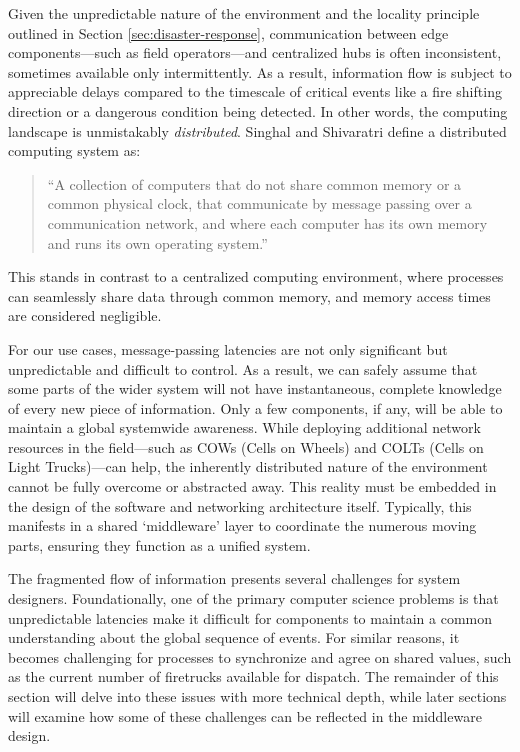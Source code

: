 \documentclass[]             %
{NASA}                       %
\theoremstyle{definition}
\begin{document}
Given the unpredictable nature of the environment and the locality
principle outlined in Section \ref{sec:disaster-response},
communication between edge components---such as field operators---and
centralized hubs is often inconsistent, sometimes available only
intermittently. As a result, information flow is subject to
appreciable delays compared to the timescale of critical events like a
fire shifting direction or a dangerous condition being detected. In
other words, the computing landscape is unmistakably
\emph{distributed}. Singhal and Shivaratri \cite{10.5555/562065}
define a distributed computing system as:
\begin{quote}
  ``A collection of computers that do not share common
  memory or a common physical clock, that communicate by message
  passing over a communication network, and where each computer has
  its own memory and runs its own operating system.''
\end{quote}
This stands in contrast to a centralized computing environment, where
processes can seamlessly share data through common memory, and memory
access times are considered negligible.

For our use cases, message-passing latencies are not only significant
but unpredictable and difficult to control. As a result, we can safely
assume that some parts of the wider system will not have
instantaneous, complete knowledge of every new piece of
information. Only a few components, if any, will be able to maintain a
global systemwide awareness. While deploying additional network
resources in the field—such as COWs (Cells on Wheels) and COLTs (Cells
on Light Trucks)—can help, the inherently distributed nature of the
environment cannot be fully overcome or abstracted away. This reality
must be embedded in the design of the software and networking
architecture itself. Typically, this manifests in a shared
`middleware' layer to coordinate the numerous moving parts, ensuring
they function as a unified system.

The fragmented flow of information presents several challenges for
system designers. Foundationally, one of the primary computer science
problems is that unpredictable latencies make it difficult for
components to maintain a common understanding about the global
sequence of events. For similar reasons, it becomes challenging for
processes to synchronize and agree on shared values, such as the
current number of firetrucks available for dispatch. The remainder of
this section will delve into these issues with more technical depth,
while later sections will examine how some of these challenges can be
reflected in the middleware design.
\end{document}
